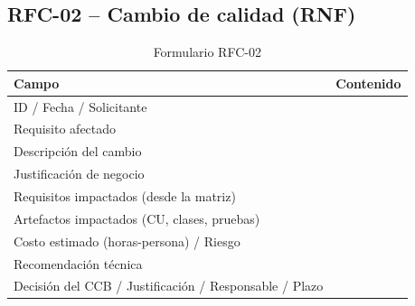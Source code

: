 \documentclass[journal,onecolumn]{IEEEtran}
\newcommand{\guia}[2]{%
	\begin{mdframed}[style=guia]
		\sloppy
		\noindent\textbf{Responsable: #1}\\[2pt]
		#2
	\end{mdframed}
}
\newif\ifguias
\let\guiaoriginal\guia
\renewcommand{\guia}[2]{\ifguias\guiaoriginal{#1}{#2}\fi}
\begin{document}
	\guia{Kevin (Integrante 2)}{%
		RFC de \textbf{alcance} (nuevo requisito). Esta es la que debe derivar de un
		\textbf{conflicto real}: el ERS ya tiene la tabla de la Sección 2.4.2, «Conflictos
		potenciales entre stakeholders», con siete conflictos documentados (publicación incompleta,
		confianza sanitaria, privacidad, cruza mal interpretada, alcance académico, validación
		documental limitada, comunicación inadecuada). Tomar uno de ahí y citarlo por su fila: así
		el origen es verificable y no una invención. Incluir alternativas evaluadas y riesgo, no
		solo costo.}
	
	\subsection{RFC-02 -- Cambio de calidad (RNF)}
	
	\begin{table}[H]
		\centering
		\caption{Formulario RFC-02}
		\begin{tabular}{L{5.2cm} L{8.5cm}}
			\toprule
			\textbf{Campo} & \textbf{Contenido} \\
			\midrule
			ID / Fecha / Solicitante & \\
			Requisito afectado & \\
			Descripción del cambio & \\
			Justificación de negocio & \\
			Requisitos impactados (desde la matriz) & \\
			Artefactos impactados (CU, clases, pruebas) & \\
			Costo estimado (horas-persona) / Riesgo & \\
			Recomendación técnica & \\
			Decisión del CCB / Justificación / Responsable / Plazo & \\
			\bottomrule
		\end{tabular}
	\end{table}
	
	\guia{Jonathan (Integrante 3)}{%
		RFC de \textbf{calidad}: modificación de uno de los 16 RNF del ERS. Candidatos con margen
		real de discusión: RNF-02 (disponibilidad), RNF-03 (tiempo de respuesta), RNF-06 (exactitud
		del componente de IA), RNF-07 (precisión en validación de imágenes) o los de explicabilidad
		RNF-13 a RNF-15. Enlazar el RNF con la característica correspondiente de
		ISO/IEC~25010:2023 \cite{iso25010} y analizar el efecto cruzado sobre otros RNF ---
		subir exactitud suele castigar tiempo de respuesta, y eso es justo lo que el CCB delibera.}
	
\end{document}
